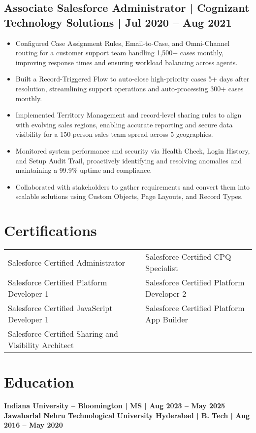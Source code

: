 \documentclass[a4paper,11pt]{article}
\begin{document}
\subsection{Associate Salesforce Administrator | Cognizant Technology Solutions | Jul 2020 – Aug 2021}
\begin{itemize}
    \item Configured Case Assignment Rules, Email-to-Case, and Omni-Channel routing for a customer support team handling 1,500+ cases monthly, improving response times and ensuring workload balancing across agents.
    \item Built a Record-Triggered Flow to auto-close high-priority cases 5+ days after resolution, streamlining support operations and auto-processing 300+ cases monthly.
    \item Implemented Territory Management and record-level sharing rules to align with evolving sales regions, enabling accurate reporting and secure data visibility for a 150-person sales team spread across 5 geographies.
    \item Monitored system performance and security via Health Check, Login History, and Setup Audit Trail, proactively identifying and resolving anomalies and maintaining a 99.9\% uptime and compliance.
    \item Collaborated with stakeholders to gather requirements and convert them into scalable solutions using Custom Objects, Page Layouts, and Record Types.
\end{itemize}

\section*{Certifications}
\begin{tabular}{@{}p{} p{}@{}}
Salesforce Certified Administrator & Salesforce Certified CPQ Specialist \\
Salesforce Certified Platform Developer 1 & Salesforce Certified Platform Developer 2 \\
Salesforce Certified JavaScript Developer 1 & Salesforce Certified Platform App Builder \\
Salesforce Certified Sharing and Visibility Architect & \\
\end{tabular}

\section*{Education}
\textbf{Indiana University – Bloomington | MS | Aug 2023 – May 2025}\\
\textbf{Jawaharlal Nehru Technological University Hyderabad | B. Tech | Aug 2016 – May 2020}
\end{document}
